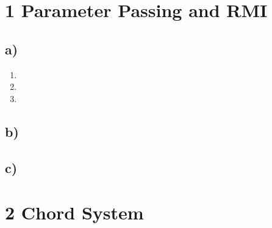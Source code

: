 \documentclass{scrartcl}
\author{Felix Bühler\\2973410 \and Clemens Lieb\\3130838 \and Steffen Wonner\\2862123 \and Fabian Bühler\\2953320}
\title{\gettitle}
\subtitle{\getsubtitle}
\begin{document}
\maketitle

\section*{1 Parameter Passing and RMI}
\subsection*{a)}
\begin{enumerate}[label=(\roman*)]
	\item 
	\item 
	\item 
\end{enumerate}

\subsection*{b)}

\subsection*{c)}


\section*{2 Chord System}
\end{document}
